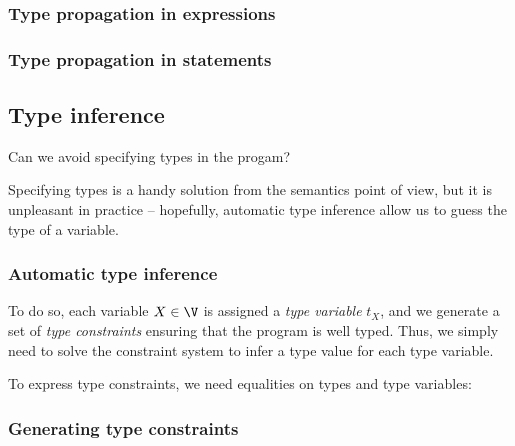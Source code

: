 \documentclass[toc, titlepaged]{../cs-classes/cs-classes}
\begin{document}
\subsubsection{Type propagation in expressions}

\subsubsection{Type propagation in statements}


\subsection{Type inference}
\begin{center}
    Can we avoid specifying types in the progam?
\end{center}
Specifying types is a handy solution from the semantics point of view, but it is unpleasant in practice -- hopefully, automatic type inference allow us to guess the type of a variable.

\subsubsection{Automatic type inference}
To do so, each variable $X\in\V$ is assigned a \emph{type variable} $t_X$, and we generate a set of \emph{type constraints} ensuring that the program is well typed. Thus, we simply need to solve the constraint system to infer a type value for each type variable. 

To express type constraints, we need equalities on types and type variables:
\begin{figure}[H]
    \centering
    \begin{grammar}
        \gskip
    \end{grammar}
\end{figure}

\subsubsection{Generating type constraints}
\end{document}
